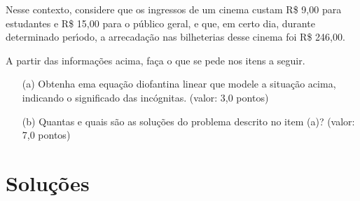 \documentclass{report}
\begin{document}
Nesse contexto, considere que os ingressos de um cinema custam R\$ 9,00 para estudantes e R\$ 15,00 para o p\'ublico geral, e que, em certo dia, durante determinado per\'\i odo, a arrecada\c c\~ao nas bilheterias desse cinema foi R\$ 246,00.

A partir das informa\c c\~oes acima, fa\c ca o que se pede nos itens a seguir.

\begin{enumerate}

\item[(a)] Obtenha ema equa\c c\~ao diofantina linear que modele a situa\c c\~ao acima, indicando o significado das inc\'ognitas. (valor: 3,0 pontos)

\item[(b)] Quantas e quais s\~ao as solu\c c\~oes do problema descrito no item (a)? (valor: 7,0 pontos)

\end{enumerate}

\section{\color{red} Solu\c c\~oes}
\end{document}
